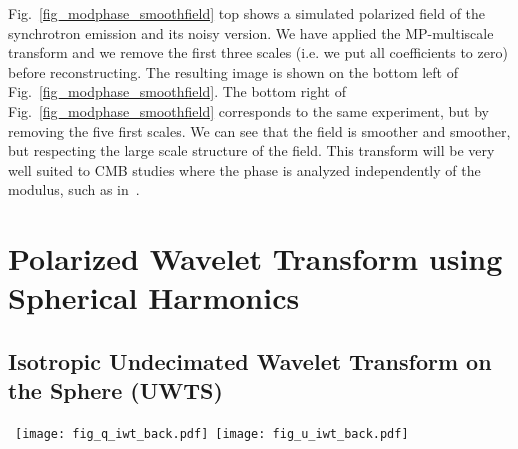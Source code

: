 Fig.~\ref{fig_modphase_smoothfield} top  shows a simulated polarized field of the synchrotron emission and its noisy version.
We have applied the MP-multiscale transform and we remove the first three scales (i.e. we put all coefficients to zero) before 
reconstructing. The resulting image is shown on the bottom left of Fig.~\ref{fig_modphase_smoothfield}. The bottom right of 
Fig.~\ref{fig_modphase_smoothfield} corresponds to the same experiment, but by removing the five first scales. We can see that 
the field is smoother and smoother, but respecting the large scale structure of the field. This transform will be very well suited 
to CMB studies where the phase is analyzed independently of the modulus, such as in~\citep{coles05,naselsky05}.


\newpage
\section{Polarized Wavelet Transform using Spherical Harmonics}
\label{sec:pol_iwt}

\subsection{Isotropic Undecimated Wavelet Transform on the Sphere (UWTS) }
\label{sec:UWTS}

\begin{figure*}[htb]
\centerline{
 \hbox{
 \texttt{[image: fig\_q\_iwt\_back.pdf]}
 \texttt{[image: fig\_u\_iwt\_back.pdf]}
 }
 }
\caption{Q-isotropic wavelet transform backprojection (left) and U-isotropic wavelet backprojection (right).}
\label{fig_qu_iwt_back}
\end{figure*}


